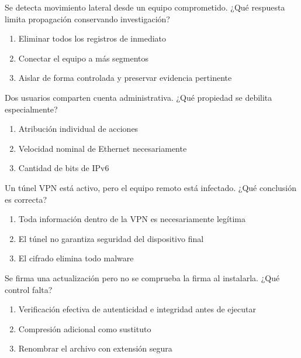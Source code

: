 \noindent\begin{minipage}{\linewidth}\setlength{\parskip}{4pt}\label{q:R-092}
Se detecta movimiento lateral desde un equipo comprometido. ¿Qué respuesta limita propagación conservando investigación?
\begin{enumerate}[label=\Alph*),nosep]
\item Eliminar todos los registros de inmediato
\item Conectar el equipo a más segmentos
\item Aislar de forma controlada y preservar evidencia pertinente
\end{enumerate}\end{minipage}\par\medskip

\noindent\begin{minipage}{\linewidth}\setlength{\parskip}{4pt}\label{q:R-093}
Dos usuarios comparten cuenta administrativa. ¿Qué propiedad se debilita especialmente?
\begin{enumerate}[label=\Alph*),nosep]
\item Atribución individual de acciones
\item Velocidad nominal de Ethernet necesariamente
\item Cantidad de bits de IPv6
\end{enumerate}\end{minipage}\par\medskip

\noindent\begin{minipage}{\linewidth}\setlength{\parskip}{4pt}\label{q:R-094}
Un túnel VPN está activo, pero el equipo remoto está infectado. ¿Qué conclusión es correcta?
\begin{enumerate}[label=\Alph*),nosep]
\item Toda información dentro de la VPN es necesariamente legítima
\item El túnel no garantiza seguridad del dispositivo final
\item El cifrado elimina todo malware
\end{enumerate}\end{minipage}\par\medskip

\noindent\begin{minipage}{\linewidth}\setlength{\parskip}{4pt}\label{q:R-095}
Se firma una actualización pero no se comprueba la firma al instalarla. ¿Qué control falta?
\begin{enumerate}[label=\Alph*),nosep]
\item Verificación efectiva de autenticidad e integridad antes de ejecutar
\item Compresión adicional como sustituto
\item Renombrar el archivo con extensión segura
\end{enumerate}\end{minipage}\par\medskip

